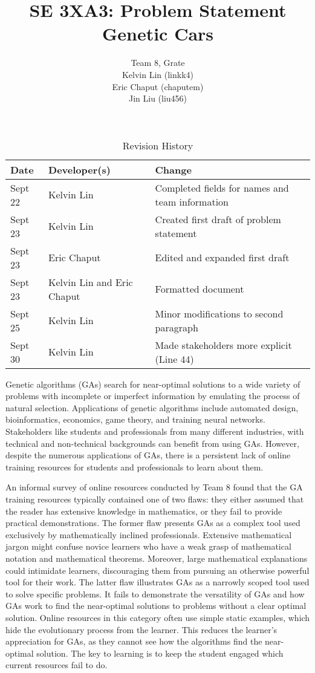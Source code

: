 \documentclass{article}
\title{SE 3XA3: Problem Statement\\Genetic Cars}
\author{Team 8, Grate
		\\ Kelvin Lin (linkk4)
		\\ Eric Chaput (chaputem)
		\\ Jin Liu (liu456)
}
\date{}
\begin{document}
\begin{table}[hp]
\color{blue}
\caption{Revision History} \label{TblRevisionHistory}
\begin{tabularx}{\textwidth}{llX}
\toprule
\textbf{Date} & \textbf{Developer(s)} & \textbf{Change}\\
\midrule
Sept 22 & Kelvin Lin & Completed fields for names and team information\\
Sept 23 & Kelvin Lin & Created first draft of problem statement\\
Sept 23 & Eric Chaput & Edited and expanded first draft\\
Sept 23 & Kelvin Lin and Eric Chaput& Formatted document\\
Sept 25 & Kelvin Lin & Minor modifications to second paragraph\\
Sept 30 & Kelvin Lin & Made stakeholders more explicit (Line 44)\\
\bottomrule
\end{tabularx}
\end{table}

\newpage
\color{black}
\maketitle

Genetic algorithms (GAs) search for near-optimal solutions to a wide variety of 
problems with incomplete or imperfect information by emulating the process of 
natural selection. Applications of genetic algorithms include automated design, 
bioinformatics, economics, game theory, and training neural networks. 
Stakeholders like students 
and professionals from many different industries, with technical and 
non-technical backgrounds can benefit from using GAs. However, despite the 
numerous applications of GAs, there is a persistent lack of online training 
resources for students and professionals to learn about them. 

An informal survey of online resources conducted by Team 8 found that the GA 
training resources typically contained one of two flaws: they either assumed 
that the reader has extensive knowledge in mathematics, or they fail to provide 
practical demonstrations. The former flaw presents GAs as a complex tool used 
exclusively by mathematically inclined professionals. Extensive mathematical 
jargon might confuse novice learners who have a weak grasp of mathematical 
notation and mathematical theorems. Moreover, large mathematical explanations 
could intimidate learners, discouraging them from pursuing an otherwise powerful 
tool for their work. The latter flaw illustrates GAs as a narrowly scoped tool 
used to solve specific problems. It fails to demonstrate the versatility of GAs 
and how GAs work to find the near-optimal solutions to problems without a clear 
optimal solution. Online resources in this category often use simple static 
examples, which hide the evolutionary process from the learner. This reduces the 
learner's appreciation for GAs, as they cannot see how the algorithms find the 
near-optimal solution. The key to learning is to keep the student engaged which 
current resources fail to do.
\end{document}
